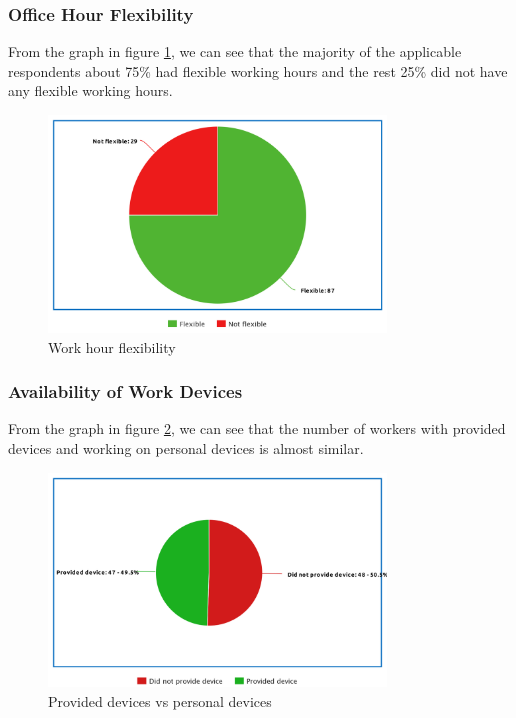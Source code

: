 \documentclass[11pt]{article}
\begin{document}
\subsubsection{Office Hour Flexibility}
From the graph in figure \ref{flexibility}, we can see that the majority of the applicable respondents about 75\% had flexible working hours and the rest 25\% did not have any flexible working hours. 
\newpage
\begin{figure}[!ht]
	\centering
	\includegraphics[width=0.8\textwidth]{Images/Experience/flexibility.png}
	\caption{Work hour flexibility}
	\centering
	\label{flexibility}
\end{figure}

\subsubsection{Availability of Work Devices}
From the graph in figure \ref{devices}, we can see that the number of workers with provided devices and working on personal devices is almost similar.  
\begin{figure}[!ht]
	\centering
	\includegraphics[width=0.8\textwidth]{Images/Experience/devices.png}
	\caption{Provided devices vs personal devices}
	\centering
	\label{devices}
\end{figure}
\end{document}
